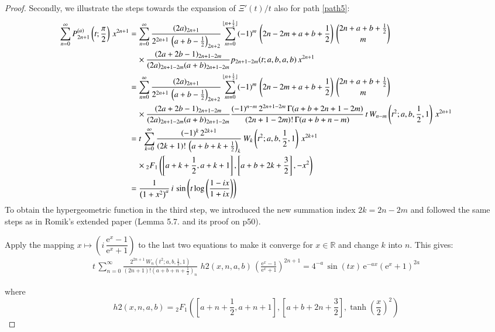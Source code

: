 \documentclass[a4paper,11pt,twoside]{amsart}
\newcommand{\verifiedeq}{=}
\newcommand{\defeq}{=}
\newcommand{\verifiedeq}{\stackrel{\checkmark}{=}}
\newcommand{\defeq}{\stackrel{\scriptscriptstyle \textnormal{def}}{=}}
\begin{document}
\begin{proof}
Secondly, we illustrate the steps towards the expansion of $\Xi'(t)/t$ also for path \ref{path5}: 
\begin{align}
 \sum_{n=0}^\infty P_{2n+1}^{(a)}\left(t;\frac{\pi}{2}\right)\,x^{2n+1} &\defeq\sum_{n=0}^\infty \frac{(2a)_{2n+1}}{2^{2n+1}\,\left(a+b-\frac12\right)_{2n+2}} \sum_{m=0}^{\lfloor n+\frac12 \rfloor} (-1)^m\,\left(2n-2m+a+b+\frac12\right)\,\binom{2n+a+b+\frac12}{m}\, \notag\\ &\quad\times \frac{(2a+2b-1)_{2n+1-2m}}{(2a)_{2n+1-2m}(a+b)_{2n+1-2m}}  p_{2n+1-2m}(t;a,b,a,b)\,x^{2n+1} \notag \\
 &\defeq\sum_{n=0}^\infty \frac{(2a)_{2n+1}}{2^{2n+1}\,\left(a+b-\frac12\right)_{2n+2}} \sum_{m=0}^{\lfloor n+\frac12 \rfloor} (-1)^m\,\left(2n-2m+a+b+\frac12\right)\,\binom{2n+a+b+\frac12}{m}\, \notag \\ &\quad\times\frac{(2a+2b-1)_{2n+1-2m}}{(2a)_{2n+1-2m}(a+b)_{2n+1-2m}} \frac{(-1)^{n-m}\,2^{2n+1-2m}\,\Gamma(a+b+2n+1-2m)}{(2n+1-2m)!\,\Gamma(a+b+n-m)}\,t\,W_{n-m}\left(t^2;a,b,\frac12,1\right)\,x^{2n+1}\notag \\
 &\defeq t\,\sum_{k=0}^\infty \frac{(-1)^k\,2^{2k+1}}{(2k+1)!\,\left(a+b+k+\frac12\right)_{k}}\,W_k\left(t^2;a,b,\frac12,1\right)\,x^{2k+1}\,\\ &\quad \times{}_2F_1\left(\left[a+k+\frac12, a+k+1\right],\left[a+b+2k+\frac32\right],-x^2\right) \notag \\
 &\defeq \frac{1}{\left(1+x^2\right)^a}\, i\,\sin\left(t\log\left(\frac{1-ix}{1+ix}\right)\right) 
\end{align}
To obtain the hypergeometric function in the third step, we introduced the new summation index $2k = 2n-2m$ and followed the same steps as in Romik's extended paper (Lemma 5.7. and its proof on p50). 

Apply the mapping $x \mapsto \left(i\,\dfrac{\textrm{e}^{x}-1}{\textrm{e}^{x}+1}\right)$ to the last two equations to make it converge for $x \in \mathbb{R}$ and change $k$ into $n$. This gives: 
\begin{align}
t\,\sum_{n=0}^\infty \frac{2^{2n+1}\,W_n\left(t^2;a,b,\frac12,1\right)}{(2n+1)!\left(a+b+n+\frac12\right)_n}\, \,h2(x,n,a,b)\,\left(\frac{\textrm{e}^{x}-1}{\textrm{e}^{x}+1}\right)^{2n+1} \verifiedeq 4^{-a}\,\sin(tx)\,\mathrm{e}^{-ax}\left(\mathrm{e}^x+1\right)^{2a} 
\end{align}

where $$h2(x,n,a,b) \defeq {}_2F_1\left(\left[a+n+\frac12, a+n+1\right],\left[a+b+2n+\frac32\right],\tanh\left(\frac{x}{2}\right)^2\right)$$


\end{proof}
\end{document}

